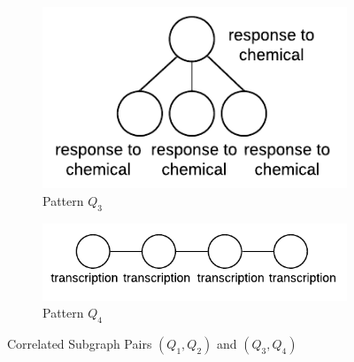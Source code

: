 \begin{figure}[tb!]
	\begin{subfigure}[b]{0.12\textwidth}
	\hspace*{-5.9mm}
	\includegraphics[scale=0.5]{img_ex/proc_1.pdf}
	\caption{Pattern $Q_3$}
		\label{fig:p1}
	\end{subfigure}%
	\begin{subfigure}[b]{0.30\textwidth}
		\hspace*{10mm}\includegraphics[scale=0.6]{img_ex/proc_2.pdf}
		\caption{Pattern $Q_4$}
		\label{fig:p2}
	\end{subfigure}
	\caption{Correlated Subgraph Pairs $(Q_1,Q_2)$ and $(Q_3,Q_4)$}
	\label{fig:yeast}
\end{figure}



